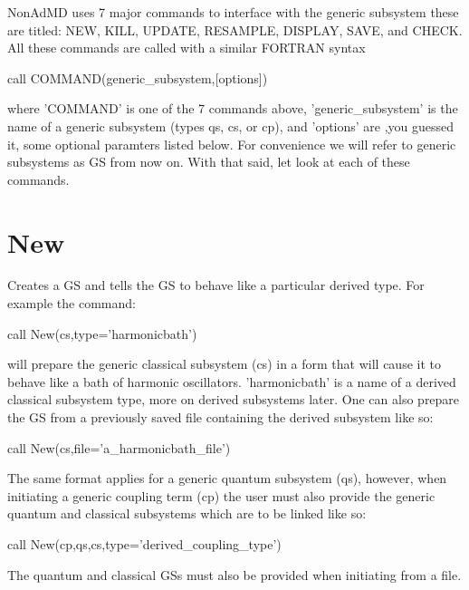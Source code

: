 Non\-Ad\-M\-D uses 7 major commands to interface with the generic subsystem these are titled\-: N\-E\-W, K\-I\-L\-L, U\-P\-D\-A\-T\-E, R\-E\-S\-A\-M\-P\-L\-E, D\-I\-S\-P\-L\-A\-Y, S\-A\-V\-E, and C\-H\-E\-C\-K. All these commands are called with a similar F\-O\-R\-T\-R\-A\-N syntax\par
 \par
 call C\-O\-M\-M\-A\-N\-D(generic\-\_\-subsystem,\mbox{[}options\mbox{]})\par
 \par
 where 'C\-O\-M\-M\-A\-N\-D' is one of the 7 commands above, 'generic\-\_\-subsystem' is the name of a generic subsystem (types qs, cs, or cp), and 'options' are ,you guessed it, some optional paramters listed below. For convenience we will refer to generic subsystems as G\-S from now on. With that said, let look at each of these commands.\par
 \hypertarget{_interface_New}{}\section{New}\label{_interface_New}
Creates a G\-S and tells the G\-S to behave like a particular derived type. For example the command\-:\par
 \par
 call New(cs,type='harmonicbath')\par
 \par
 will prepare the generic classical subsystem (cs) in a form that will cause it to behave like a bath of harmonic oscillators. 'harmonicbath' is a name of a derived classical subsystem type, more on derived subsystems later. One can also prepare the G\-S from a previously saved file containing the derived subsystem like so\-:\par
 \par
 call New(cs,file='a\-\_\-harmonicbath\-\_\-file')\par
 \par
 The same format applies for a generic quantum subsystem (qs), however, when initiating a generic coupling term (cp) the user must also provide the generic quantum and classical subsystems which are to be linked like so\-:\par
 \par
 call New(cp,qs,cs,type='derived\-\_\-coupling\-\_\-type')\par
 \par
 The quantum and classical G\-Ss must also be provided when initiating from a file.\par
